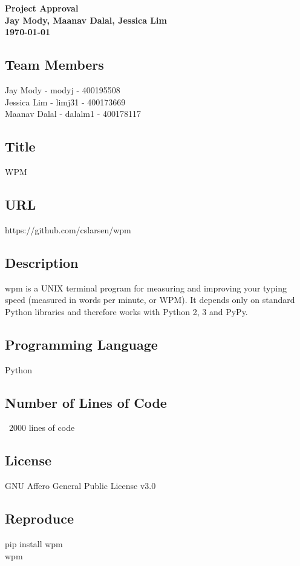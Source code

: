 \documentclass{article}
\begin{document}
\begin{center}
    {\huge \textbf{Project Approval}}\\[2mm]
    {\large \textbf{Jay Mody, Maanav Dalal, Jessica Lim}}\\[2mm]
    {\large \textbf{\today}}\\[2mm]
\end{center}
\medskip

\subsection*{Team Members}

Jay Mody - modyj - 400195508\\
Jessica Lim - limj31 - 400173669\\
Maanav Dalal - dalalm1 - 400178117

\subsection*{Title}
WPM

\subsection*{URL}
https://github.com/cslarsen/wpm

\subsection*{Description}
wpm is a UNIX terminal program for measuring and improving your typing speed (measured in words per minute, or WPM).
It depends only on standard Python libraries and therefore works with Python 2, 3 and PyPy.

\subsection*{Programming Language}
Python

\subsection*{Number of Lines of Code}
~2000 lines of code

\subsection*{License}
GNU Affero General Public License v3.0

\subsection*{Reproduce}
pip install wpm\\
wpm\\
\end{document}

